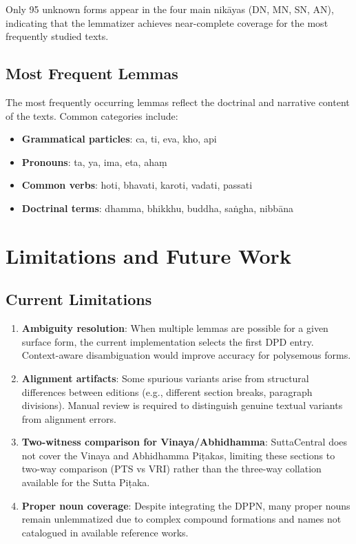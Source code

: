 \documentclass[unnumsec,webpdf,contemporary,large]{oup-authoring-template}
\begin{document}
Only 95 unknown forms appear in the four main nikāyas (DN, MN, SN, AN), indicating that the lemmatizer achieves near-complete coverage for the most frequently studied texts.

\subsection{Most Frequent Lemmas}

The most frequently occurring lemmas reflect the doctrinal and narrative content of the texts. Common categories include:

\begin{itemize}
\item \textbf{Grammatical particles}: ca, ti, eva, kho, api
\item \textbf{Pronouns}: ta, ya, ima, eta, ahaṃ
\item \textbf{Common verbs}: hoti, bhavati, karoti, vadati, passati
\item \textbf{Doctrinal terms}: dhamma, bhikkhu, buddha, saṅgha, nibbāna
\end{itemize}

\section{Limitations and Future Work}

\subsection{Current Limitations}

\begin{enumerate}
\item \textbf{Ambiguity resolution}: When multiple lemmas are possible for a given surface form, the current implementation selects the first DPD entry. Context-aware disambiguation would improve accuracy for polysemous forms.

\item \textbf{Alignment artifacts}: Some spurious variants arise from structural differences between editions (e.g., different section breaks, paragraph divisions). Manual review is required to distinguish genuine textual variants from alignment errors.

\item \textbf{Two-witness comparison for Vinaya/Abhidhamma}: SuttaCentral does not cover the Vinaya and Abhidhamma Piṭakas, limiting these sections to two-way comparison (PTS vs VRI) rather than the three-way collation available for the Sutta Piṭaka.

\item \textbf{Proper noun coverage}: Despite integrating the DPPN, many proper nouns remain unlemmatized due to complex compound formations and names not catalogued in available reference works.
\end{enumerate}
\end{document}

